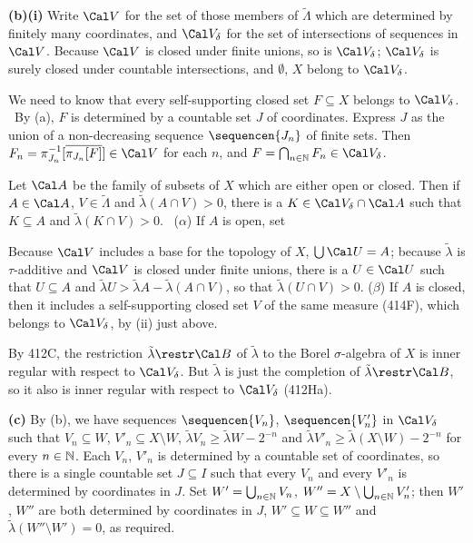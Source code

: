 {{\bf (b)(i)} Write $\Cal V$ for the set of those members of
$\tilde\Lambda$
which are determined by finitely many coordinates, and $\Cal V_{\delta}$
for the set of intersections of sequences in $\Cal V$.   Because
$\Cal V$ is closed under finite unions, so is $\Cal V_{\delta}$;
$\Cal V_{\delta}$
is surely closed under countable intersections, and $\emptyset$, $X$
belong to $\Cal V_{\delta}$.

\medskip

 We need to know that every self-supporting closed set
$F\subseteq X$ belongs to $\Cal V_{\delta}$.   \Prf\ By (a), $F$ is
determined by a countable set $J$ of coordinates.   Express $J$ as the
union of a non-decreasing sequence $\sequencen{J_n}$ of finite sets.
Then $F_n=\pi_{J_n}^{-1}[\overline{\pi_{J_n}[F]}]\in\Cal V$ for each
$n$, and $F=\bigcap_{n\in\Bbb N}F_n\in\Cal V_{\delta}$.\ \Qed

\medskip

 Let $\Cal A$ be the family of subsets of $X$ which are
either open or closed.   Then if $A\in\Cal A$, $V\in\tilde\Lambda$ and
$\tilde\lambda(A\cap V)>0$, there is a $K\in\Cal V_{\delta}\cap\Cal A$
such that $K\subseteq A$ and $\tilde\lambda(K\cap V)>0$.   \Prf\
($\alpha$) If $A$ is open, set


\noindent Because $\Cal V$ includes a base for the topology of $X$,
$\bigcup\Cal U=A$;  because $\tilde\lambda$ is $\tau$-additive and
$\Cal V$ is closed under finite unions, there is a $U\in\Cal U$ such
that $U\subseteq A$ and
$\tilde\lambda U>\tilde\lambda A-\tilde\lambda(A\cap V)$, so that
$\tilde\lambda(U\cap V)>0$.   ($\beta$) If $A$ is closed, then it
includes a
self-supporting closed set $V$ of the same measure (414F), which belongs
to $\Cal V_{\delta}$, by (ii) just above.\ \Qed

\medskip

 By 412C, the restriction $\tilde\lambda\restr\Cal B$ of
$\tilde\lambda$ to the Borel $\sigma$-algebra of $X$ is inner regular
with respect to $\Cal V_{\delta}$.   But $\tilde\lambda$
is just the completion of $\tilde\lambda\restr\Cal B$, so it also is
inner regular with respect to $\Cal V_{\delta}$ (412Ha).

\medskip

{\bf (c)} By (b), we have sequences $\sequencen{V_n}$,
$\sequencen{V'_n}$ in $\Cal V_{\delta}$ such that $V_n\subseteq W$,
$V'_n\subseteq X\setminus W$,
$\tilde\lambda V_n\ge\tilde\lambda W-2^{-n}$ and
$\tilde\lambda V'_n\ge\tilde\lambda(X\setminus W)-2^{-n}$ for every
$n\in\Bbb N$.
Each $V_n$, $V'_n$ is determined by a countable set of coordinates, so
there is a single countable set $J\subseteq I$ such that every $V_n$ and
every $V'_n$ is determined by coordinates in $J$.   Set
$W'=\bigcup_{n\in\Bbb N}V_n$, $W''=X\setminus\bigcup_{n\in\Bbb N}V'_n$;
then $W'$, $W''$ are both determined by coordinates in $J$,
$W'\subseteq W\subseteq W''$ and
$\tilde\lambda(W''\setminus W')=0$, as required.
}%

